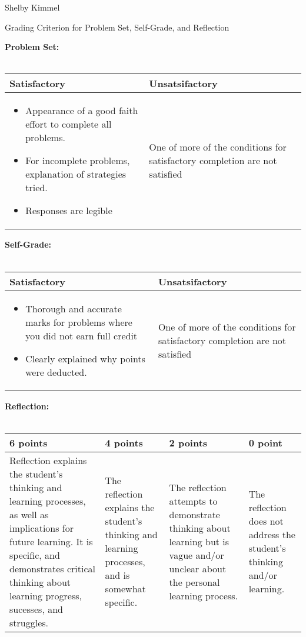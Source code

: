 \documentclass[12pt,landscape]{article}
\begin{document}
\hfill Shelby Kimmel

\begin{center}
{\huge Grading Criterion for Problem Set, Self-Grade, and Reflection}
\end{center}
\bigskip



{\large \textbf{Problem Set:}}\\~\\
{\renewcommand{\arraystretch}{2}
\begin{tabular}{|p{13cm}|p{7cm}|}
\hline
{\bf Satisfactory}& {\bf Unsatsifactory}\\
\hline
\begin{itemize}
\item Appearance of a good faith effort to complete all problems.
\item For incomplete problems, explanation of strategies tried.
\item Responses are legible
\end{itemize}
  & One of more of the conditions for satisfactory completion are not satisfied\\
  \hline
\end{tabular}}

\bigskip\bigskip
{\large \textbf{ Self-Grade:}}\\~\\
{\renewcommand{\arraystretch}{2}
\begin{tabular}{|p{13cm}|p{7cm}|}
\hline
{\bf Satisfactory}& {\bf Unsatsifactory}\\
\hline
\begin{itemize}
\item Thorough and accurate marks for problems where you did not earn full credit
\item Clearly explained why points were deducted.
\end{itemize}
  & One of more of the conditions for satisfactory completion are not satisfied\\
  \hline
\end{tabular}}

\newpage
{\large \textbf{ Reflection:}}\\~\\
{\renewcommand{\arraystretch}{2}
\begin{tabular}{|p{5cm}|p{5cm}|p{5cm}|p{5cm}|}
\hline
 {\bf 6 points} & {\bf 4 points} & {\bf 2 points} & {\bf 0 point} \\
\hline

Reflection explains the student's thinking and learning processes, as well as implications for future learning. It is specific, and demonstrates critical thinking about learning progress, sucesses, and struggles.& 
The reflection explains the student's thinking and learning processes, and is somewhat specific.&
The reflection attempts to demonstrate thinking about learning but is vague and/or unclear about the personal learning process.&
The reflection does not address the student's thinking and/or learning.\\
\hline
 \end{tabular}
}
\end{document}
